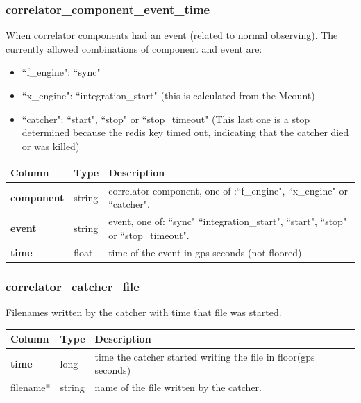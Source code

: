 \documentclass{article}
\begin{document}
{\subsubsection{correlator\_component\_event\_time}
When correlator components had an event (related to normal observing). The currently allowed combinations of component and event are:
\begin{itemize}
  \item ``f\_engine": ``sync"
  \item ``x\_engine": ``integration\_start" (this is calculated from the Mcount)
  \item ``catcher": ``start", ``stop" or ``stop\_timeout" (This last one is a stop determined because the redis key timed out, indicating that the catcher died or was killed)
 \end{itemize}
\begin{center}
 \begin{tabular}{| p{4cm} | p{2cm} | p{10cm} |}
\hline
 {\bf Column} & {\bf Type}  & {\bf Description} \\ [0.5ex]  \hline\hline
\textbf{component} & string & correlator component, one of :``f\_engine", ``x\_engine" or ``catcher".\\ \hline
\textbf{event} & string & event, one of: ``sync" ``integration\_start", ``start", ``stop" or ``stop\_timeout".\\ \hline
\textbf{time} & float & time of the event in gps seconds (not floored)\\ \hline
\end{tabular}
\end{center}

\subsubsection{correlator\_catcher\_file}
Filenames written by the catcher with time that file was started.
\begin{center}
 \begin{tabular}{| p{4cm} | p{2cm} | p{10cm} |}
\hline
 {\bf Column} & {\bf Type}  & {\bf Description} \\ [0.5ex]  \hline\hline
\textbf{time} & long & time the catcher started writing the file in floor(gps seconds)\\ \hline
filename* & string & name of the file written by the catcher.
\\ \hline
\end{tabular}
\end{center}

}
\end{document}
